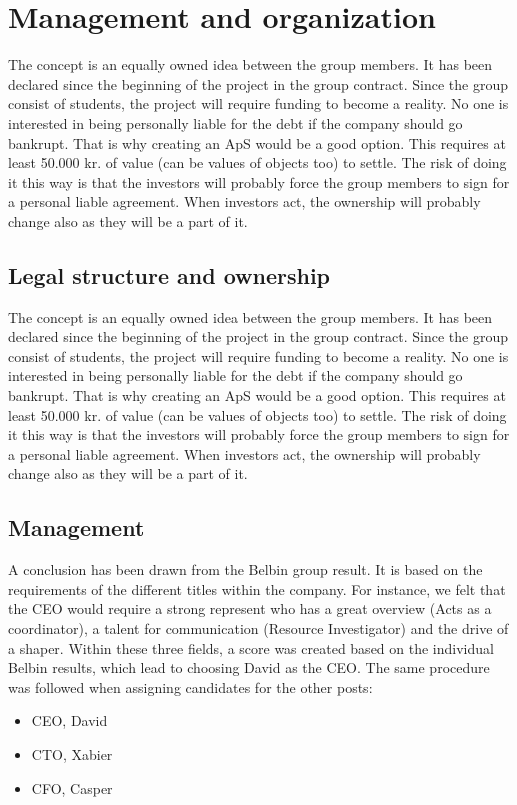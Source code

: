 \section{Management and organization}
The concept is an equally owned idea between the group members. It has been declared since the beginning of the project in the group contract.
Since the group consist of students, the project will require funding to become a reality. No one is interested in being personally liable for the debt if the company should go bankrupt. That is why creating an ApS would be a good option. This requires at least 50.000 kr. of value (can be values of objects too) to settle. The risk of doing it this way is that the investors will probably force the group members to sign for a personal liable agreement. 
When investors act, the ownership will probably change also as they will be a part of it.

\subsection{Legal structure and ownership}
The concept is an equally owned idea between the group members. It has been declared since the beginning of the project in the group contract.
Since the group consist of students, the project will require funding to become a reality. No one is interested in being personally liable for the debt if the company should go bankrupt. That is why creating an ApS would be a good option. This requires at least 50.000 kr. of value (can be values of objects too) to settle. The risk of doing it this way is that the investors will probably force the group members to sign for a personal liable agreement. 
When investors act, the ownership will probably change also as they will be a part of it.

\subsection{Management}
A conclusion has been drawn from the Belbin group result. It is based on the requirements of the different titles within the company.  For instance, we felt that the CEO would require a strong represent who has a great overview (Acts as a coordinator), a talent for communication (Resource Investigator) and the drive of a shaper. Within these three fields, a score was created based on the individual Belbin results, which lead to choosing David as the CEO. 
The same procedure was followed when assigning candidates for the other posts:
\begin{itemize}
\item CEO, David
\item CTO, Xabier
\item CFO, Casper
\end{itemize}

